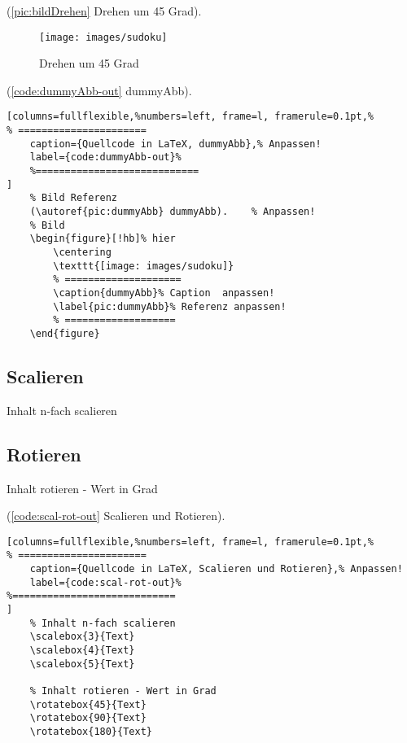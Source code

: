 (\autoref{pic:bildDrehen} Drehen um 45 Grad).    %
\begin{figure}[!hb]%
	\centering
  \texttt{[image: images/sudoku]}
	\caption{Drehen um 45 Grad}%
	\label{pic:bildDrehen}%
\end{figure}

\newpage


(\autoref{code:dummyAbb-out} dummyAbb).
\lstset{language=[LaTeX]TeX} %
\begin{lstlisting}[columns=fullflexible,%numbers=left, frame=l, framerule=0.1pt,%
% ======================
	caption={Quellcode in LaTeX, dummyAbb},% Anpassen!
	label={code:dummyAbb-out}%
	%============================
]
	% Bild Referenz
	(\autoref{pic:dummyAbb} dummyAbb).    % Anpassen!
	% Bild
	\begin{figure}[!hb]% hier
		\centering
		\texttt{[image: images/sudoku]}
		% ====================
		\caption{dummyAbb}% Caption  anpassen!
		\label{pic:dummyAbb}% Referenz anpassen!
		% ===================
	\end{figure}
\end{lstlisting}

\newpage

\subsection{Scalieren}

Inhalt n-fach scalieren

\vspace{10mm}

\scalebox{3}{Text}
\scalebox{4}{Text}
\scalebox{5}{Text}

\subsection{Rotieren}

Inhalt rotieren - Wert in Grad

\vspace{10mm}



(\autoref{code:scal-rot-out} Scalieren und Rotieren).
\lstset{language=[LaTeX]TeX} %
\begin{lstlisting}[columns=fullflexible,%numbers=left, frame=l, framerule=0.1pt,%
% ======================
	caption={Quellcode in LaTeX, Scalieren und Rotieren},% Anpassen!
	label={code:scal-rot-out}%
%============================
]
	% Inhalt n-fach scalieren
	\scalebox{3}{Text}
	\scalebox{4}{Text}
	\scalebox{5}{Text}

	% Inhalt rotieren - Wert in Grad
	\rotatebox{45}{Text}
	\rotatebox{90}{Text}
	\rotatebox{180}{Text}
\end{lstlisting}

